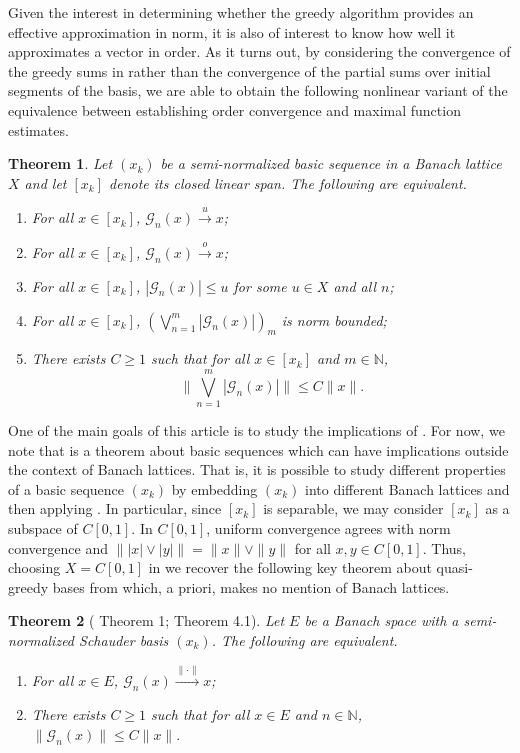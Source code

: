 \documentclass[12pt,leqno]{amsart}
\newtheorem{theorem}{Theorem}[section]
\numberwithin{equation}{section}
\theoremstyle{definition}
\begin{document}
Given the interest in determining whether the greedy algorithm provides an effective approximation in norm, it is also of interest to know how well it approximates a vector in order. As it turns out, by  considering the convergence of the greedy sums in  rather than the convergence of the partial sums over initial segments of the basis, we are able to obtain the following nonlinear variant of the equivalence between establishing order convergence and maximal function estimates.
\begin{theorem}\label{u-greedy theorem intro}
Let $(x_k)$ be a semi-normalized basic sequence in a Banach lattice $X$ and let $[x_k]$ denote its closed linear span.  The following are equivalent.
\begin{enumerate}
\item For all $x\in [x_k]$,  $\mathcal{G}_n(x)\xrightarrow{u}x$;
\item For all $x\in [x_k]$, $\mathcal{G}_n(x)\xrightarrow{o}x$;
\item For all $x\in [x_k]$, $|\mathcal{G}_n(x)|\leq u$ for some $u\in X$ and all $n$;
\item For all $x\in [x_k]$, $(\bigvee_{n=1}^m|\mathcal{G}_n(x)|)_{m}$ is norm bounded;
\item There exists $C\geq 1$ such that for all $x\in [x_k]$ and $m\in \mathbb{N}$,
$$\bigg\|\bigvee_{n=1}^m\left|\mathcal{G}_n(x)\right|\bigg\|\leq C\|x\|.$$
\end{enumerate}
\end{theorem}
One of the main goals of this article is to study the implications of . For now, we note that  is a theorem about basic sequences which can have implications outside the context of Banach lattices.  That is, it is possible to study different properties of a basic sequence $(x_k)$ by embedding $(x_k)$ into different Banach lattices and then applying .  In particular, since $[x_k]$ is separable, we may consider $[x_k]$ as a subspace of $C[0,1]$. In $C[0,1]$,  uniform convergence agrees with norm convergence and $\| |x|\vee |y|\|=\|x\|\vee\|y\|$ for all $x,y\in C[0,1]$. Thus, choosing $X=C[0,1]$ in  we recover the following key theorem about quasi-greedy bases from \cite{W00} which, a priori, makes no mention of Banach lattices. 
\begin{theorem}[\cite{W00} Theorem 1; \cite{AABW19} Theorem 4.1]\label{W00}
Let $E$ be a Banach space with a semi-normalized Schauder basis $(x_k)$. The following are equivalent.
\begin{enumerate}
\item For all $x\in E$,  $\mathcal{G}_n(x)\xrightarrow{\|\cdot\|}x$;
\item There exists $C\geq 1$ such that for all $x\in E$ and $n\in \mathbb{N}$,
$\|\mathcal{G}_n(x)\|\leq C\|x\|.$
\end{enumerate}
\end{theorem}
\end{document}
